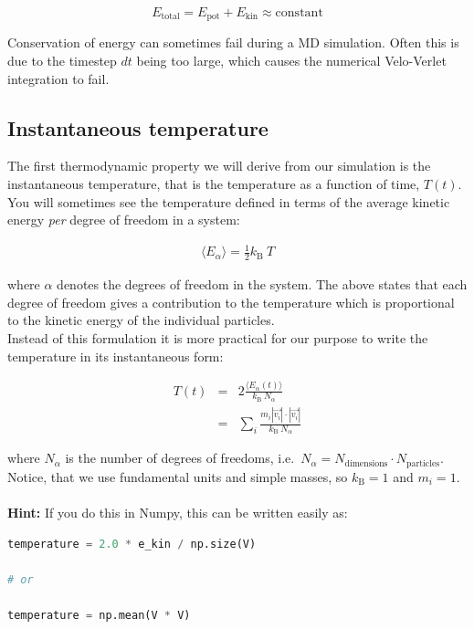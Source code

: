 \documentclass{article}
\begin{document}
\begin{equation}
    E_{\mathrm{total}} = E_{\mathrm{pot}} + E_{\mathrm{kin}} \approx \mathrm{constant}
\end{equation}

Conservation of energy can sometimes fail during a MD simulation. Often this
is due to the timestep $dt$ being too large, which causes the numerical
Velo-Verlet integration to fail.

\subsection{Instantaneous temperature}

The first thermodynamic property we will derive from our simulation is the instantaneous temperature,
that is the temperature as a function of time, $T(t)$.
You will sometimes see the temperature defined in terms of the average kinetic energy \textit{per} degree of freedom in a system:

\begin{eqnarray}
    \langle E_{\alpha} \rangle = \frac{1}{2} k_\mathrm{B} \ T
\end{eqnarray}

where $\alpha$ denotes the degrees of freedom in the system. The above states that each degree of freedom gives a contribution to the temperature which is proportional to the kinetic energy of the individual particles.\\
Instead of this formulation it is more practical for our purpose to write the temperature in its instantaneous form:

\begin{eqnarray}
    T(t) &=& 2 \frac{\langle E_{\alpha}(t) \rangle}{k_\mathrm{B} \ N_\alpha }\\
         &=& \sum_i \frac{m_i|\vec{v_i}| \cdot |\vec{v_i}|}{k_\mathrm{B} \ N_\alpha}
\end{eqnarray}

where $N_\alpha$ is the number of degrees of freedoms, i.e.~$N_\alpha = N_{\mathrm{dimensions}} \cdot N_{\mathrm{particles}}$. Notice, that we use fundamental units and simple masses, so $k_\mathrm{B} = 1$ and $m_i = 1$.\\\\

\textbf{Hint:} If you do this in Numpy, this can be written easily as:
\begin{lstlisting}[language=python]
temperature = 2.0 * e_kin / np.size(V)

# or

temperature = np.mean(V * V)
\end{lstlisting}
\end{document}
